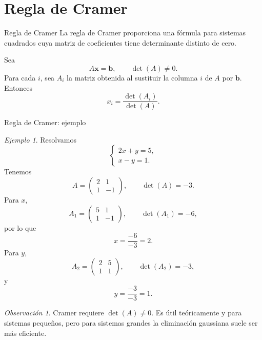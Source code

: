 \documentclass[aspectratio=169,9pt]{beamer}
\theoremstyle{remark}
\newtheorem{observacion}[definicion]{Observación}
\newtheorem{ejemplo}[definicion]{Ejemplo}
\begin{document}
\section{Regla de Cramer}
\begin{frame}[allowframebreaks,t]{Regla de Cramer}
La regla de Cramer proporciona una fórmula para sistemas cuadrados cuya matriz de coeficientes tiene
determinante distinto de cero.

Sea
\[
A\mathbf x=\mathbf b,\qquad \det(A)\neq0.
\]
Para cada $i$, sea $A_i$ la matriz obtenida al sustituir la columna $i$ de $A$ por $\mathbf b$. Entonces
\[
\boxed{x_i=\frac{\det(A_i)}{\det(A)}}.
\]

\end{frame}
\begin{frame}[t,shrink=18]{Regla de Cramer: ejemplo}
\begin{ejemplo}
Resolvamos
\[
\begin{cases}
2x+y=5,\\
x-y=1.
\end{cases}
\]
Tenemos
\[
A=
\begin{pmatrix}2&1\\1&-1\end{pmatrix},
\qquad
\det(A)=-3.
\]
Para $x$,
\[
A_1=
\begin{pmatrix}5&1\\1&-1\end{pmatrix},
\qquad
\det(A_1)=-6,
\]
por lo que
\[
x=\frac{-6}{-3}=2.
\]
Para $y$,
\[
A_2=
\begin{pmatrix}2&5\\1&1\end{pmatrix},
\qquad
\det(A_2)=-3,
\]
y
\[
y=\frac{-3}{-3}=1.
\]
\end{ejemplo}

\begin{observacion}
Cramer requiere $\det(A)\neq0$. Es útil teóricamente y para sistemas pequeños, pero para sistemas
grandes la eliminación gaussiana suele ser más eficiente.
\end{observacion}
\end{frame}
\end{document}
